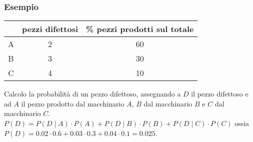 \documentclass[11pt]{report}
\begin{document}
\subsubsection{Esempio}
\begin{center}
    \begin{tabular}{ c | c c }
        & pezzi difettosi & \% pezzi prodotti sul totale \\
        \hline
        A & 2 & 60 \\
        B & 3 & 30 \\
        C & 4 & 10 \\
    \end{tabular}
\end{center}
Calcolo la probabilità di un pezzo difettoso, assegnando a $D$ il pezzo difettoso e ad $A$ il pezzo prodotto dal macchinario $A$, $B$ dal macchinario $B$ e $C$ dal macchinario $C$.\\
$P(D) = P(D \mid A) \cdot P(A) + P(D \mid B) \cdot P(B) + P(D \mid C) \cdot P(C)$ ossia $P(D) = 0.02 \cdot 0.6 + 0.03 \cdot 0.3 + 0.04 \cdot 0.1 = 0.025$.
\end{document}
